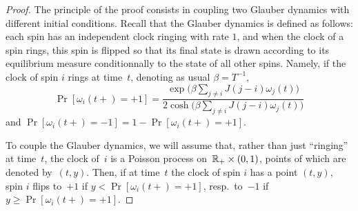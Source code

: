 \begin{proof}
The principle of the proof consists in coupling two Glauber dynamics
with different initial conditions.
Recall that the Glauber dynamics is defined as follows:
each spin has an independent clock ringing with rate $1$,
and when the clock of a spin rings, this spin is flipped so that its final state is drawn
according to its equilibrium measure conditionnally to the state of all other spins.
Namely, if the clock of spin $i$ rings at time~$t$,
denoting as usual $\beta = T^{-1}$,
\[ \Pr[\omega_i(t+)=+1] = \frac{\exp\big(\beta\sum_{j\neq i}J(j-i)\omega_j(t)\big)}
{2\cosh\big(\beta\sum_{j\neq i}J(j-i)\omega_j(t)\big)} \]
and $\Pr[\omega_i(t+)=-1] = 1-\Pr[\omega_i(t+)=+1]$.

To couple the Glauber dynamics, we will assume that, rather than just ``ringing'' at time~$t$,
the clock of~$i$ is a Poisson process on~$\mathbb{R}_+ \times (0,1)$,
points of which are denoted by~$(t,y)$.
Then, if at time~$t$ the clock of spin $i$ has a point $(t,y)$,
spin $i$ flips to~$+1$ if $y<\Pr[\omega_i(t+)=+1]$,
resp.\ to~$-1$ if~$y\geq\Pr[\omega_i(t+)=+1]$.


\end{proof}
